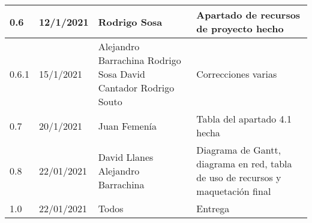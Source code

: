 \documentclass[12pt]{article}
\begin{document}
\begin{tabularx}{\textwidth}{ |l|l|p{5cm}|X| }
	\hline
	0.6                    & 12/1/2021                                                                        & Rodrigo Sosa                  & Apartado de recursos de proyecto hecho                                          \\
	\hline
	0.6.1                  & 15/1/2021                                                                        & Alejandro Barrachina \newline
	Rodrigo Sosa \newline
	David Cantador \newline
	Rodrigo Souto \newline & Correcciones varias                                                                                                                                                                                \\
	\hline
	0.7                    & 20/1/2021                                                                        & Juan Femenía                  & Tabla del apartado 4.1 hecha                                                    \\
	\hline
	0.8                    & 22/01/2021                                                                       & David Llanes \newline
	Alejandro Barrachina   & Diagrama de Gantt, diagrama en red, tabla de uso de recursos y maquetación final                                                                                                                   \\
	\hline
	1.0                    & 22/01/2021                                                                       & Todos                         & Entrega                                                                         \\
	\hline
\end{tabularx}

\newpage
\tableofcontents
\newpage

\newpage

\newpage

\newpage

\newpage

\newpage

\newpage

\newpage
\printglossary[title=Apendice A. Glosario]
\newpage
{}
\end{document}
